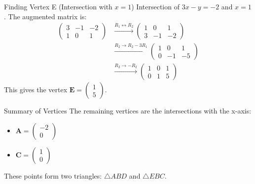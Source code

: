 \documentclass{beamer}
\theoremstyle{remark}
\newcommand{\myvec}[1]{\ensuremath{\begin{pmatrix}#1\end{pmatrix}}}
\let\vec\mathbf
\numberwithin{equation}{section}
\begin{document}
\begin{frame}{Finding Vertex E (Intersection with $x=1$)}
Intersection of $3x - y = -2$ and $x=1$. The augmented matrix is:
\begin{align*}
 \left(\begin{array}{cc|c} 3 & -1 & -2 \\ 1 & 0 & 1 \end{array}\right)
    &\xrightarrow{R_1 \leftrightarrow R_2}
    \left(\begin{array}{cc|c} 1 & 0 & 1 \\ 3 & -1 & -2 \end{array}\right) \\
    &\xrightarrow{R_2 \to R_2 - 3R_1}
    \left(\begin{array}{cc|c} 1 & 0 & 1 \\ 0 & -1 & -5 \end{array}\right) \\
    &\xrightarrow{R_2 \to -R_2}
    \left(\begin{array}{cc|c} 1 & 0 & 1 \\ 0 & 1 & 5 \end{array}\right)
\end{align*}
This gives the vertex $\vec{E} = \myvec{1 \\ 5}$.
\end{frame}

\begin{frame}{Summary of Vertices}
The remaining vertices are the intersections with the x-axis:
\begin{itemize}
    \item $\vec{A} = \myvec{-2\\0}$
    \item $\vec{C} = \myvec{1\\0}$
\end{itemize}
\vspace{1cm}
These points form two triangles: $\triangle ABD$ and $\triangle EBC$.
\end{frame}
\end{document}
